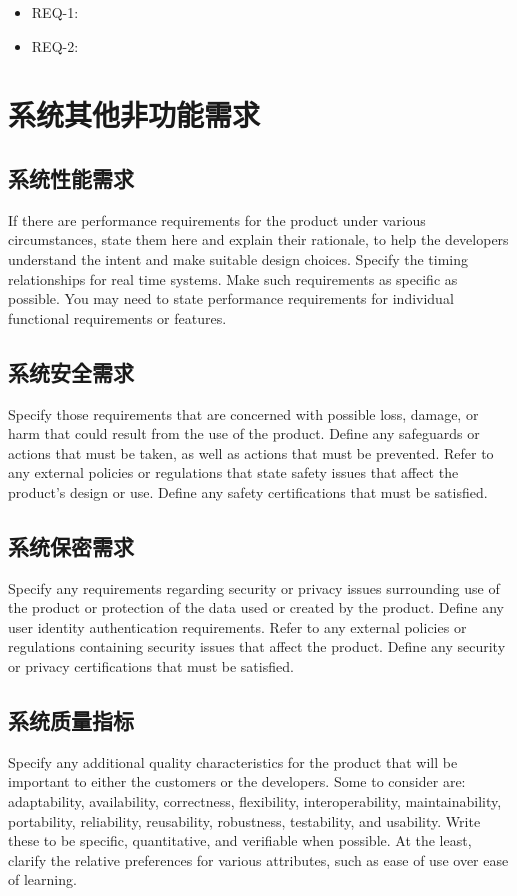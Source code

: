 \documentclass{ctexart}
\begin{document}
\begin{itemize}
    \item REQ-1:
    \item REQ-2:
\end{itemize}



\section{系统其他非功能需求}\label{S:other-nonfunctional-requirements}
\subsection{系统性能需求}
If there are performance requirements for the product under various 
circumstances, state them here and explain their rationale, to help the 
developers understand the intent and make suitable design choices. Specify the 
timing relationships for real time systems. Make such requirements as specific 
as possible. You may need to state performance requirements for individual 
functional requirements or features.


\subsection{系统安全需求}
Specify those requirements that are concerned with possible loss, damage, or 
harm that could result from the use of the product. Define any safeguards or 
actions that must be taken, as well as actions that must be prevented. Refer to 
any external policies or regulations that state safety issues that affect the 
product's design or use. Define any safety certifications that must be 
satisfied.


\subsection{系统保密需求}
Specify any requirements regarding security or privacy issues surrounding use 
of the product or protection of the data used or created by the product. Define 
any user identity authentication requirements. Refer to any external policies or 
regulations containing security issues that affect the product. Define any 
security or privacy certifications that must be satisfied.


\subsection{系统质量指标}
Specify any additional quality characteristics for the product that will be 
important to either the customers or the developers. Some to consider are: 
adaptability, availability, correctness, flexibility, interoperability, 
maintainability, portability, reliability, reusability, robustness, testability, 
and usability. Write these to be specific, quantitative, and verifiable when 
possible. At the least, clarify the relative preferences for various attributes, 
such as ease of use over ease of learning.
\end{document}
